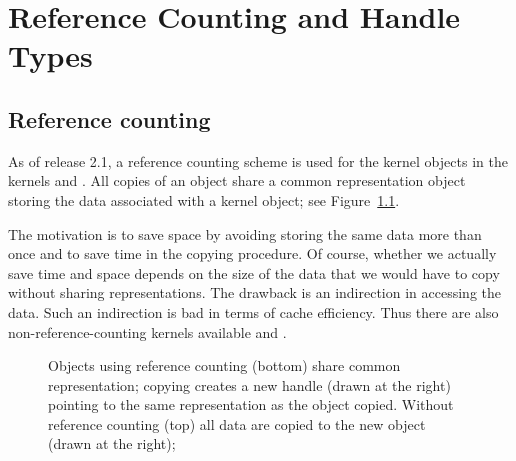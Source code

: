 
\chapter{Reference Counting and Handle Types\label{chap:reference_counting}}


\section{Reference counting}
As of release 2.1, a reference counting%
 scheme is used for
the kernel objects in the kernels  and 
. 
All copies of an object share a common representation object storing
the data associated with a kernel object; see Figure~\ref{fig:refcounted}.

The motivation is to save space by avoiding storing the same data more 
than once and to save time in the copying procedure. 
Of course, whether we actually save time and space depends on the size 
of the data that we would have to copy without sharing representations.
The drawback is an indirection in accessing the data. Such an indirection is 
bad in terms of cache efficiency. 
Thus there are also non-reference-counting kernels available
 and .

\begin{figure}
\caption{Objects using reference counting (bottom) share common representation;
copying creates a new handle (drawn at the right) pointing to the same 
representation as the object copied. Without reference counting (top) 
all data are copied to the new object (drawn at the right);\label{fig:refcounted}} 
\end{figure}


